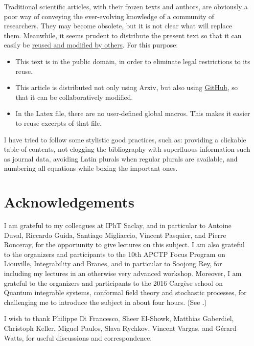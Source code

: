 \documentclass[12pt, a4paper, notitlepage, twoside]{report}
\numberwithin{equation}{section}
\theoremstyle{break}
\begin{document}
Traditional scientific articles, with their frozen texts and authors, are obviously a poor way of conveying the ever-evolving knowledge of a community of researchers.
They may become obsolete, but it is not clear what will replace them.
Meanwhile, it seems prudent to distribute the present text so that it can easily be 
\href{http://researchpracticesandtools.blogspot.fr/2014/02/the-case-for-emancipating-articles-from.html}
{reused and modified by others}.
For this purpose:
\begin{itemize}
 \item This text is in the public domain, in order to eliminate legal restrictions to its reuse. 
\item This article is distributed not only using Arxiv, but also using \href{https://github.com/ribault/CFT-Review}{GitHub}, so that it can be collaboratively modified. 
\item In the Latex file, there are no user-defined global macros.
This makes it easier to reuse excerpts of that file. 
\end{itemize}

I have tried to follow some stylistic good practices, such as: providing a clickable table of contents, not clogging the bibliography with superfluous information such as journal data, avoiding Latin plurals when regular plurals are available, and numbering all equations while boxing the important ones. 


\section{Acknowledgements}

I am grateful to my colleagues at IPhT Saclay, and in particular to Antoine Duval, Riccardo Guida, Santiago Migliaccio, Vincent Pasquier, and Pierre Ronceray, for the opportunity to give lectures on this subject. I am also grateful to the organizers and participants to the 10th APCTP Focus Program on Liouville, Integrability and Branes, and in particular to Soojong Rey, for including my lectures in an otherwise very advanced workshop. Moreover, I am grateful to the organizers and participants to the 2016 Carg\`ese school on Quantum integrable systems, conformal field theory and stochastic processes, for challenging me to introduce the subject in about four hours. (See \cite{rib16}.) 

I wish to thank Philippe Di Francesco, Sheer El-Showk, Matthias Gaberdiel, Christoph Keller, Miguel Paulos, Slava Rychkov, Vincent Vargas, and G\'erard Watts, for useful discussions and correspondence.
\end{document}
